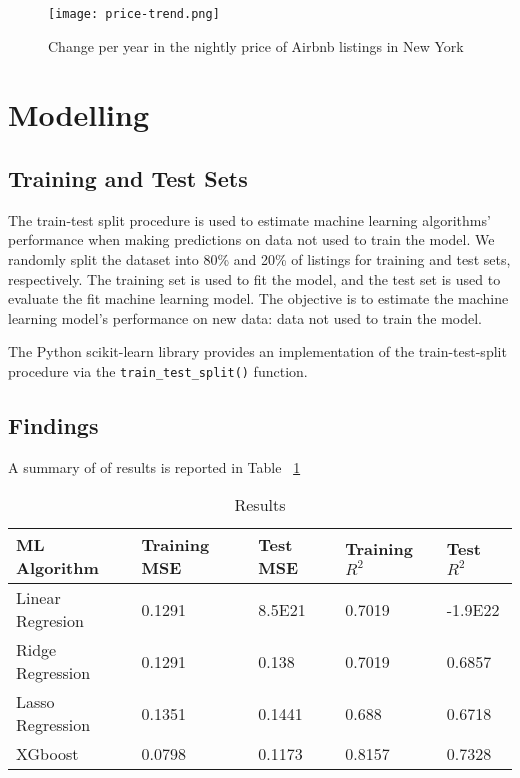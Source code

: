 \begin{figure}[!htbp] \centering
    \texttt{[image: price-trend.png]}
    \caption{Change per year in the nightly price of Airbnb listings in New York}
    \label{fig:prices-change-by-years}
\end{figure}


\section{Modelling}

\subsection{Training and Test Sets}
\label{sec:train_test_split}

The train-test split procedure is used to estimate machine learning algorithms'
performance when making predictions on data not used to train the model.  We
randomly split the dataset into 80\% and 20\% of listings for training and test
sets, respectively. The training set is used to fit the model, and the test
set is used to evaluate the fit machine learning model. The objective is to
estimate the machine learning model's performance on new data: data not used to
train the model.

The Python scikit-learn library provides an implementation of the train-test-split
procedure via the \texttt{train\_test\_split()} function.

\subsection{Findings}
\label{sec:findings}

A summary of of results is reported in Table ~\ref{tab:results}

\begin{table}[!htbp]
  \centering
  \caption{Results}
  \label{tab:results}
  \begin{tabular}{lllll}
    \hline
    ML Algorithm & Training MSE & Test MSE & Training $R^2$ & Test $R^2$ \\
    \hline
    Linear Regresion & 0.1291 &  8.5E21 &  0.7019 & -1.9E22 \\
    Ridge Regression  & 0.1291 & 0.138 & 0.7019 &  0.6857 \\
    Lasso Regression & 0.1351 & 0.1441 & 0.688 & 0.6718 \\
    XGboost &  0.0798 & 0.1173 & 0.8157 &  0.7328 \\
  \end{tabular}
\end{table}


